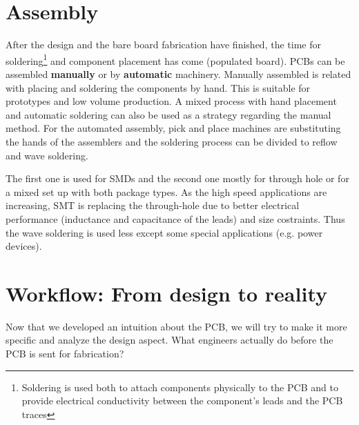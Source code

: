 \documentclass[final]{cubedoc}
\begin{document}
	
	\section{Assembly}
	
	After the design and the bare board fabrication have finished, the time for soldering\footnote{Soldering is used both to attach components physically to the PCB and to provide electrical conductivity between the component’s leads and the PCB traces} and component placement has come (populated board). PCBs can be assembled \textbf{manually} or by \textbf{automatic} machinery. Manually assembled is related with placing and soldering the components by hand. This is suitable for prototypes and low volume production. A mixed process with hand placement and automatic soldering can also be used as a strategy regarding the manual method. For the automated assembly, pick and place machines are substituting the hands of the assemblers and the soldering process can be divided to reflow and wave soldering. 
	
	
	The first one is used for SMDs and the second one mostly for through hole or for a mixed set up with both package types. 
	As the high speed applications are increasing, SMT is replacing the through-hole due to better electrical performance (inductance and capacitance of the leads) and size costraints. Thus the wave soldering is used less except some special applications (e.g. power devices).
	
	
	
	
	
	
	
	\section{Workflow: From design to reality} 
	
	Now that we developed an intuition about the PCB, we will try to make it more specific and analyze the design aspect. What engineers actually do before the PCB is sent for fabrication?
	
\end{document}
